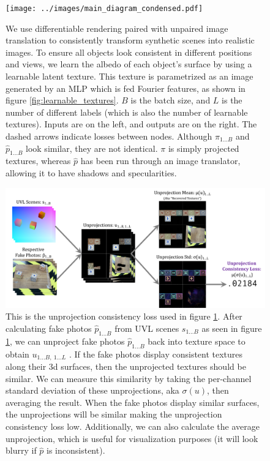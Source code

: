\documentclass{article}
\begin{document}
\begin{figure}[H]
	\begin{center}
		\texttt{[image: ../images/main\_diagram\_condensed.pdf]}
	\end{center}
	\caption{
		We use differentiable rendering paired with unpaired image translation to consistently transform synthetic scenes into realistic images.
		To ensure all objects look consistent in different positions and views, we learn the albedo of each object's surface by using a learnable latent texture.
		This texture is parametrized as an image generated by an MLP which is fed Fourier features, as shown in figure \ref{fig:learnable_textures}.
		$B$ is the batch size, and $L$ is the number of different labels (which is also the number of learnable textures).
		Inputs are on the left, and outputs are on the right.
		The dashed arrows indicate losses between nodes.
		Although $\pi_{1\dots B}$ and $\hat{p}_{1\dots B}$ look similar, they are not identical. 
		$\pi$ is simply projected textures, whereas $\hat{p}$ has been run through an image translator, allowing it to have shadows and specularities.
	}
	\label{fig:main_diagram}
\end{figure}


\begin{figure}[H]
	\begin{center}
		\includegraphics[width=400pt]{../images/unprojection_consistency_loss.pdf}
	\end{center}
	\caption{
		This is the unprojection consistency loss used in figure \ref{fig:main_diagram}.
		After calculating fake photos $\hat{p}_{1...B}$ from UVL scenes $s_{1...B}$ as seen in figure \ref{fig:main_diagram}, 
		we can unproject fake photos $\hat{p}_{1...B}$ back into texture space to obtain $u_{1...B,\ 1...L}$ .
		If the fake photos display consistent textures along their 3d surfaces, then the unprojected textures should be similar.
		We can measure this similarity by taking the per-channel standard deviation of these unprojections, aka $\sigma(u)$, then averaging the result.
		When the fake photos display similar surfaces, the unprojections will be similar making the unprojection consistency loss low.
		Additionally, we can also calculate the average unprojection, which is useful for visualization purposes (it will look blurry if $\hat{p}$ is inconsistent).
	}
	\label{fig:unprojection_consistency_loss}
\end{figure}
\end{document}
